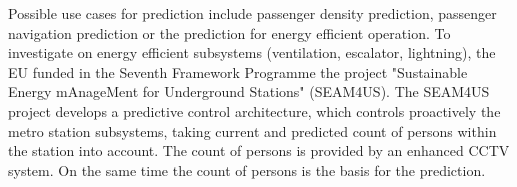 Possible use cases for prediction include passenger density prediction, passenger navigation prediction or the prediction for energy efficient operation.
% 
% 
To investigate on energy efficient subsystems (ventilation, escalator, lightning), the EU funded in the Seventh Framework Programme the project "Sustainable Energy mAnageMent for Underground Stations" (SEAM4US). The SEAM4US project develops  a predictive control architecture, which controls proactively the metro station subsystems, taking current and predicted count of persons within the station into account. The count of persons is provided by an enhanced CCTV system. On the same time the count of persons is the basis for the prediction.

